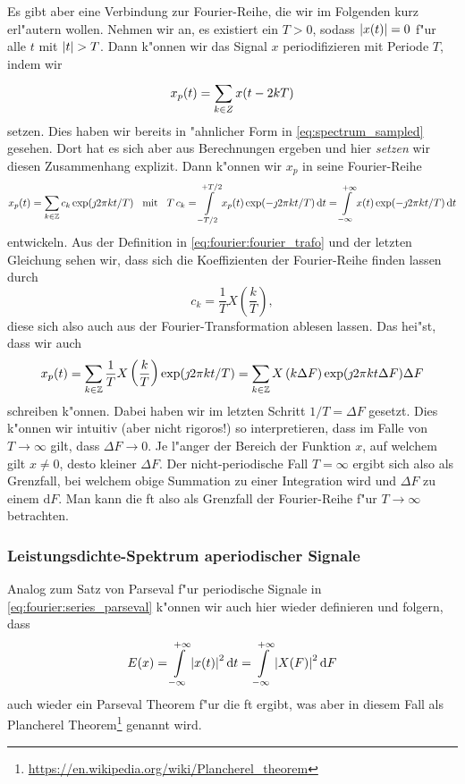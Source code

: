 Es gibt aber eine Verbindung zur Fourier-Reihe, die wir im Folgenden kurz erl"autern wollen.
Nehmen wir an, es existiert ein $T > 0$, sodass ${\left| x(t) \right|} = 0$ f"ur alle $t$ mit ${\left| t \right|} > T$.
Dann k"onnen wir das Signal $x$ periodifizieren mit Periode $T$, indem wir
\[
x_p(t) = {\sum\limits_{k \in Z}^{}{x(t - 2kT)}}
\]
setzen.
Dies haben wir bereits in "ahnlicher Form in \eqref{eq:spectrum_sampled} gesehen. 
Dort hat es sich aber aus Berechnungen ergeben und hier \emph{setzen} wir diesen Zusammenhang explizit.
Dann k"onnen wir $x_p$ in seine Fourier-Reihe 
\[
x_p(t) = {\sum\limits_{k \in \mathbb{Z}}^{}{c_k \exp(\jmath 2 \pi k t/T)}}
{\hspace{3mm} \text{mit} \hspace{3mm}}
T\,c_k = {\int\limits_{-T/2}^{+T/2}{x_p(t) \exp(- \jmath 2 \pi k t/T)}\,\mathrm{d}{t}}
    = {\int\limits_{-\infty}^{+\infty}{x(t) \exp(- \jmath 2 \pi k t/T)}\,\mathrm{d}{t}}
\]
entwickeln.
Aus der Definition in \eqref{eq:fourier:fourier_trafo} und der letzten Gleichung sehen wir, dass sich die Koeffizienten der Fourier-Reihe finden lassen durch
\begin{equation}\label{eq:fourier:c_k_fourier}
    c_k = \frac 1T X\left(\frac kT\right),
\end{equation}
diese sich also auch aus der Fourier-Transformation ablesen lassen.
Das hei"st, dass wir auch
\[
x_p(t) = {\sum\limits_{k \in \mathbb{Z}}^{}{\frac 1T X\left(\frac kT\right) \exp(\jmath 2 \pi k t/T)}}
       = {\sum\limits_{k \in \mathbb{Z}}^{}{X\left(k \Delta F\right) \exp(\jmath 2 \pi k t \Delta F) \Delta F}}
\]
schreiben k"onnen.
Dabei haben wir im letzten Schritt $1/T = \Delta F$ gesetzt.
Dies k"onnen wir intuitiv (aber nicht rigoros!) so interpretieren, dass im Falle von $T \rightarrow \infty$ gilt, dass $\Delta F \rightarrow 0$.
Je l"anger der Bereich der Funktion $x$, auf welchem gilt $x \neq 0$, desto kleiner $\Delta F$.
Der nicht-periodische Fall $T = \infty$ ergibt sich also als Grenzfall, bei welchem obige Summation zu einer Integration wird und $\Delta F$ zu einem $\mathrm{d}F$.
Man kann die \acrlong{ft} also als Grenzfall der Fourier-Reihe f"ur $T \rightarrow \infty$ betrachten.
%
%
\subsubsection{Leistungsdichte-Spektrum aperiodischer Signale}
%
Analog zum Satz von Parseval f"ur periodische Signale in \eqref{eq:fourier:series_parseval} k"onnen wir auch hier wieder definieren und folgern, dass
\begin{equation}
E(x) = {\int\limits_{-\infty}^{+\infty}{{\left| x(t) \right|}^2}\,\mathrm{d}{t}}
     = {\int\limits_{-\infty}^{+\infty}{{\left| X(F) \right|}^2}\,\mathrm{d}{F}}
\end{equation}
auch wieder ein Parseval Theorem f"ur die \acrlong{ft} ergibt, was aber in diesem Fall als Plancherel Theorem\footnote{\url{https://en.wikipedia.org/wiki/Plancherel_theorem}} genannt wird.


